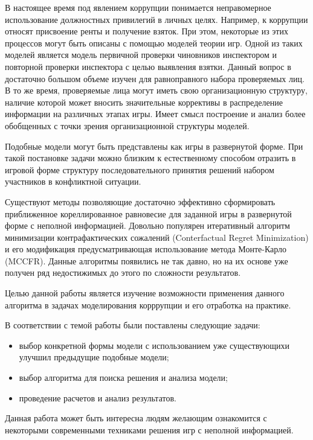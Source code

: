 \Introduction

\par
В настоящее время под явлением коррупции понимается неправомерное использование должностных привилегий в личных целях. Например, к коррупции относят присвоение ренты и получение взяток. При этом, некоторые из этих процессов могут быть описаны с помощью моделей теории игр. Одной из таких моделей является модель первичной  проверки чиновников инспектором и повторной проверки инспектора с целью выявления взятки\cite{Spengler}. Данный вопрос в достаточно большом объеме изучен для равноправного набора проверяемых лиц\cite{Kumacheva}. В то же время, проверяемые лица могут иметь свою организационную структуру, наличие которой может вносить значительные коррективы в распределение информации на различных этапах игры. Имеет смысл построение и анализ более обобщенных с точки зрения организационной структуры моделей.
\par
Подобные модели могут быть представлены как игры в развернутой форме. При такой постановке задачи можно близким к естественному способом отразить в игровой форме структуру последовательного принятия решений набором участников в конфликтной ситуации.
\par
Существуют методы позволяющие достаточно эффективно сформировать приближенное кореллированное равновесие для заданной игры в развернутой форме с неполной информацией. Довольно популярен итеративный алгоритм минимизации контрафактических сожалений (Conterfactual Regret Minimization)\cite{NIPS07cfr} и его модификация предусматривающая использование метода Монте-Карло (MCCFR)\cite{MCCFR}.  Данные алгоритмы появились не так давно, но на их основе уже получен ряд недостижимых до этого по сложности результатов.
\par
Целью данной работы является изучение возможности применения данного алгоритма в задачах моделирования корррупции и его отработка на практике.
\par
В соответствии с темой работы были поставлены следующие задачи:
\begin{itemize}
	\item выбор конкретной формы модели с использованием уже существующихи улучшил предыдущие подобные модели;
	\item выбор алгоритма для поиска решения и анализа модели;
	\item проведение расчетов и анализ результатов.
\end{itemize}
\par
Данная работа может быть интересна людям желающим ознакомится с некоторыми современными техниками решения игр с неполной информацией.
